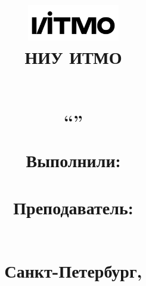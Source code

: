 \begin{titlepage}

\thispagestyle{empty}

\title{
    \includegraphics[width=4cm]{media/logo.png} \\
    \vspace{1em}
    НИУ ИТМО 
    \vspace{4em}

    \begin{center}
        \large \textsc{\textbf{\name}}
        \\ \vspace{1em}
        ``\subname''  %
    \end{center}

    \vspace{3em}

    \begin{flushright}
        {\normalsize 
            Выполнили: \\ \textbf{\madeby} \\
            \vspace{1em}
            Преподаватель: \\ \textbf{\teacher} \\
        }
    \end{flushright}	

    \vspace*{\fill}

    \begin{center}
        \small{Санкт-Петербург, \the\year}
    \end{center}
}

\author{}
\date{}
\maketitle
\thispagestyle{empty}
\end{titlepage}